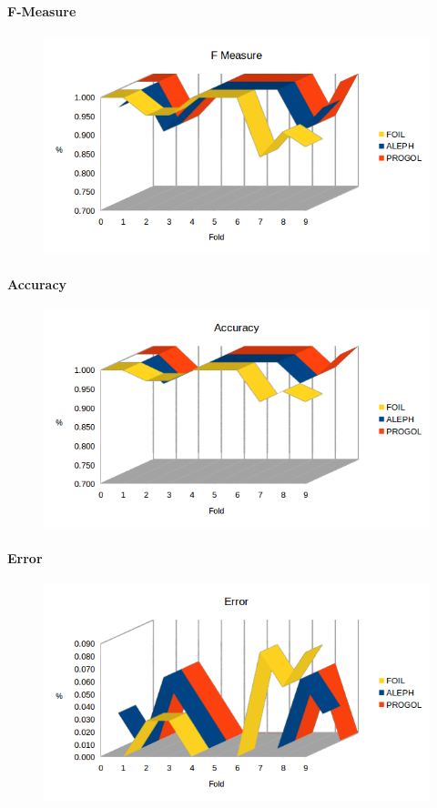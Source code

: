 \paragraph{F-Measure}
\begin{figure}[hbtp]
	\includegraphics[width=1.2\textwidth]{img/datasetGraph/jmlr/fm.png}
	\label{JMLR-F-measure}
\end{figure}
\paragraph{Accuracy}
\begin{figure}[hbtp]
	\includegraphics[width=1.2\textwidth]{img/datasetGraph/jmlr/accuracy.png}
	\label{JMLR-Accuracy}
\end{figure}
\paragraph{Error}
\begin{figure}[hbtp]
	\includegraphics[width=1.2\textwidth]{img/datasetGraph/jmlr/error.png}
	\label{JMLR-Error}
\end{figure}

